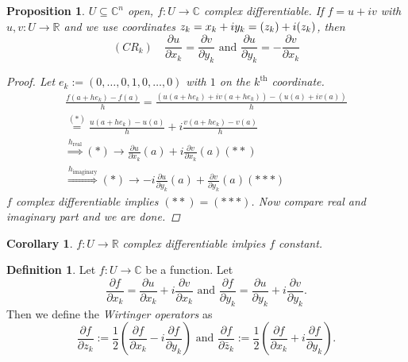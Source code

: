 \documentclass[11pt,A4]{article}
\theoremstyle{plain}
\newtheorem{prop}[thm]{Proposition}
\newtheorem{cor}[thm]{Corollary}
\theoremstyle{definition}
\newtheorem{defn}[thm]{Definition}
\theoremstyle{remark}
\newcommand{\R}{\mathbb{R}}
\newcommand{\1}{\mathbbm{1}}
\newcommand{\C}{\mathbb{C}}
\let\Re\relax
\DeclareMathOperator{\Re}{Re}
\let\Im\relax
\DeclareMathOperator{\Im}{Im}
\begin{document}
\begin{prop}
    $U\subseteq \C^{n}$ open, $f\colon U\to \C$ complex differentiable.
    If $f=u+iv$ with $u,v\colon U\to \R$ and we use coordinates $z_{k}=x_{k}+iy_{k}=\Re(z_{k})+i\Im(z_{k})$, then
    \[ (CR_{k}) \quad \frac{\partial u}{\partial x_{k}}=\frac{\partial v}{\partial y_{k}} \text{ and } \frac{\partial u}{\partial y_{k}}=-\frac{\partial v}{\partial x_{k}} \]
    \begin{proof}
	Let $e_{k}:=(0,\ldots,0,1,0,\ldots,0)$ with $1$ on the $k^{\mathrm{th}}$ coordinate.
	\begin{multline*}
	    \frac{f(a+he_{k})-f(a)}{h}=\frac{(u(a+he_{k})+iv(a+he_{k}))-(u(a)+iv(a))}{h} \\
	    \overset{(*)}{=} \frac{u(a+he_{k})-u(a)}{h} + i\frac{v(a+he_{k})-v(a)}{h} \\
	    \overset{h_{\mathrm{real}}}{\Rightarrow } (*)\to \frac{\partial u}{\partial x_{k}}(a)+i\frac{\partial v}{\partial x_{k}}(a) (**) \\
	    \overset{h_{\mathrm{imaginary}}}{\Rightarrow } (*)\to -i\frac{\partial u}{\partial y_{k}}(a)+\frac{\partial v}{\partial y_{k}}(a) (***)
	\end{multline*}
	$f$ complex differentiable implies $(**)=(***)$.
	Now compare real and imaginary part and we are done.
    \end{proof}
\end{prop}

\begin{cor}
    $f\colon U\to \R$ complex differentiable imlpies $f$ constant.
\end{cor}

\begin{defn}
    Let $f\colon U\to \C$ be a function.
    Let
    \[ \frac{\partial f}{\partial x_{k}}=\frac{\partial u}{\partial x_{k}} + i\frac{\partial v}{\partial x_{k}} \text{ and } \frac{\partial f}{\partial y_{k}}=\frac{\partial u}{\partial y_{k}}+i\frac{\partial v}{\partial y_{k}}. \]
    Then we define the \textit{Wirtinger operators} as
    \[ \frac{\partial f}{\partial z_{k}}:=\frac{1}{2}\left( \frac{\partial f}{\partial x_{k}}-i\frac{\partial f}{\partial y_{k}} \right) \text{ and } \frac{\partial f}{\partial \bar{z}_{k}}:=\frac{1}{2}\left( \frac{\partial f}{\partial x_{k}}+i\frac{\partial f}{\partial y_{k}}\right).\]
\end{defn}
\end{document}
